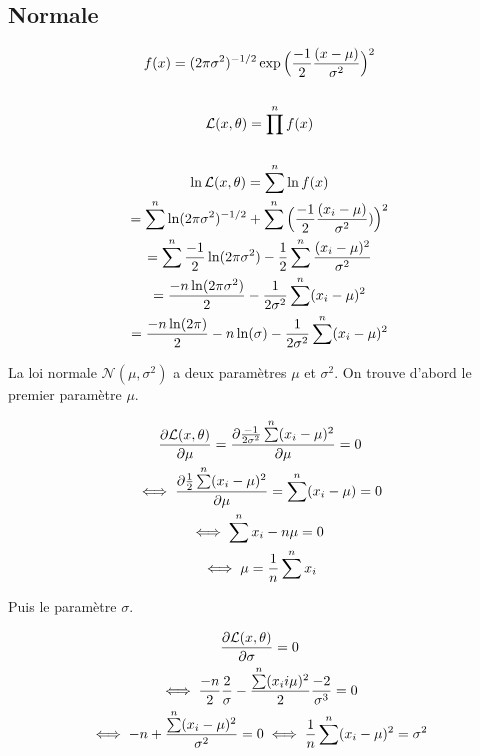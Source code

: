 \documentclass{article}
\begin{document}
\subsection{Normale}

\begin{gather*}
        f(x) = (2 \pi \sigma^2)^{-1/2} \exp\Big(\frac{-1}{2} \frac{(x-\mu)}{\sigma^2}\Big)^2 \\ \\
        {\cal L}(x, \theta) = \prod\limits^n f(x) \\ \\
        \ln{\cal L}(x, \theta) = \sum\limits^n \ln f(x) \\
        = \sum\limits^n \ln(2 \pi \sigma^2)^{-1/2} + \sum\limits^n \Big(\frac{-1}{2} \frac{(x_i-\mu)}{\sigma^2})\Big)^2 \\
        = \sum\limits^n \frac{- 1}{2} \ln(2 \pi \sigma^2) - \frac{1}{2} \sum\limits^n \frac{(x_i -\mu)^2}{\sigma^2} \\
        = \frac{-n \ln(2 \pi \sigma^2)}{2} - \frac{1}{2 \sigma^2} \sum\limits^n (x_i - \mu)^2 \\
        = \frac{-n \ln(2 \pi)}{2} - {n \ln(\sigma)} - \frac{1}{2 \sigma^2} \sum\limits^n (x_i - \mu)^2
\end{gather*}

La loi normale $\mathcal{N}(\mu, \sigma^2)$ a deux paramètres $\mu$ et $\sigma^2$.
On trouve d'abord le premier paramètre $\mu$.

\begin{gather*}
    \frac{\partial \likelihood(x, \theta)}{\partial \mu} = \frac{\partial \frac{-1}{2 \sigma^2} \sum\limits^n (x_i - \mu)^2}{\partial \mu} = 0 \\
    \iff \frac{\partial \frac{1}{2}\sum\limits^n (x_i-\mu)^2}{\partial \mu} = \sum\limits^n (x_i - \mu) = 0 \\
    \iff \sum\limits^n x_i - n\mu = 0 \\
    \iff \mu = \frac{1}{n} \sum\limits^n x_i
\end{gather*}

Puis le paramètre $\sigma$.

\begin{gather*}
    \frac{\partial {\cal L}(x, \theta)}{\partial \sigma} = 0 \\
    \iff \frac{-n}{2} \frac{2}{\sigma} - \frac{\sum\limits^n (x_i i \mu)^2}{2} \frac{-2}{\sigma^3}  = 0\\
    \iff -n + \frac{\sum\limits^n (x_i - \mu)^2}{\sigma^2} = 0
    \iff \frac{1}{n} \sum\limits^n (x_i - \mu)^2 = \sigma^2
\end{gather*}
\end{document}
